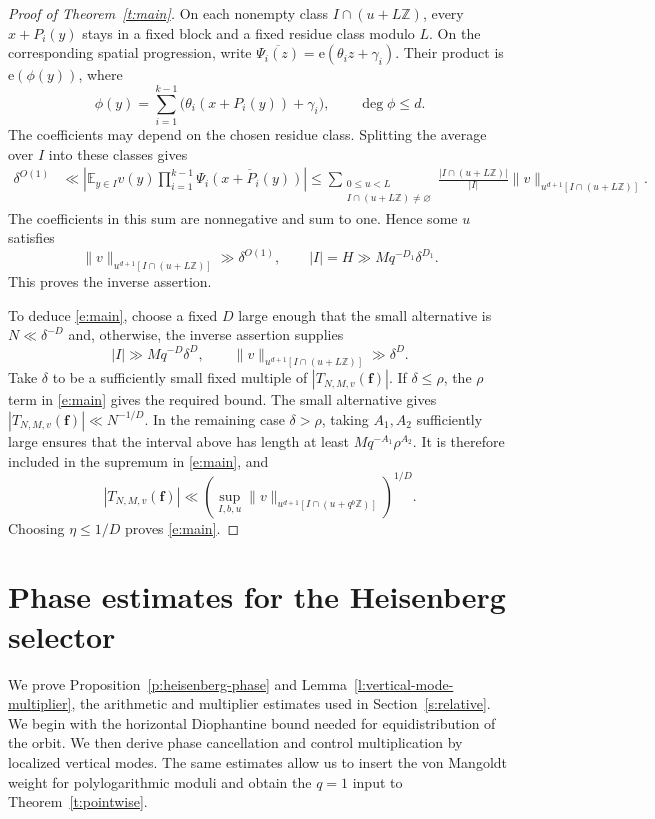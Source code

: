 \documentclass[12pt]{amsart}
\newcommand{\1}{\mathbf 1}
\newcommand{\e}{\mathrm e}
\theoremstyle{definition}
\begin{document}
\begin{proof}[Proof of Theorem~\ref{t:main}]
On each nonempty class $I\cap(u+L\mathbb Z)$, every
$x+P_i(y)$ stays in a fixed block and a fixed residue class
modulo $L$. On the corresponding spatial progression, write
$\overline{\Psi_i(z)}=\e(\theta_i z+\gamma_i)$.
Their product is $\e(\phi(y))$, where
\[
 \phi(y)=\sum_{i=1}^{k-1}
       \bigl(\theta_i(x+P_i(y))+\gamma_i\bigr),
 \qquad \deg\phi\leq d.
\]
The coefficients may depend on the chosen residue class.
Splitting the average over $I$ into these classes gives
\[
\begin{aligned}
 \delta^{O(1)}
 &\ll
 \left|\mathbb E_{y\in I}v(y)
       \prod_{i=1}^{k-1}\overline{\Psi_i(x+P_i(y))}\right|\leq
 \sum_{\substack{0\leq u<L\\I\cap(u+L\mathbb Z)\ne\varnothing}}
 \frac{|I\cap(u+L\mathbb Z)|}{|I|}
 \|v\|_{u^{d+1}[I\cap(u+L\mathbb Z)]}.
\end{aligned}
\]
The coefficients in this sum are nonnegative and sum to one.
Hence some $u$ satisfies
\[
 \|v\|_{u^{d+1}[I\cap(u+L\mathbb Z)]}\gg\delta^{O(1)},
 \qquad |I|=H\gg Mq^{-D_1}\delta^{D_1}.
\]
This proves the inverse assertion.

To deduce \eqref{e:main}, choose a fixed $D$ large enough that
the small alternative is $N\ll\delta^{-D}$ and, otherwise, the
inverse assertion supplies
\[
 |I|\gg Mq^{-D}\delta^D,
 \qquad
 \|v\|_{u^{d+1}[I\cap(u+L\mathbb Z)]}\gg\delta^D.
\]
Take $\delta$ to be a sufficiently small fixed multiple of
$|T_{N,M,v}(\mathbf f)|$. If $\delta\leq\rho$, the $\rho$ term
in \eqref{e:main} gives the required bound. The small alternative
gives $|T_{N,M,v}(\mathbf f)|\ll N^{-1/D}$. In the remaining case
$\delta>\rho$, taking $A_1,A_2$ sufficiently large ensures that
the interval above has length at least $Mq^{-A_1}\rho^{A_2}$.
It is therefore included in the supremum in \eqref{e:main}, and
\[
 |T_{N,M,v}(\mathbf f)|
 \ll
 \left(\sup_{I,b,u}
 \|v\|_{u^{d+1}[I\cap(u+q^b\mathbb Z)]}\right)^{1/D}.
\]
Choosing $\eta\leq1/D$ proves \eqref{e:main}.
\end{proof}

\section{Phase estimates for the Heisenberg selector}\label{s:example}

We prove Proposition~\ref{p:heisenberg-phase} and
Lemma~\ref{l:vertical-mode-multiplier}, the arithmetic and multiplier
estimates used in Section~\ref{s:relative}. We begin with the horizontal
Diophantine bound needed for equidistribution of the orbit.
We then derive phase cancellation and control multiplication by
localized vertical modes. The same estimates allow us to insert
the von Mangoldt weight for polylogarithmic moduli and obtain the
\(q=1\) input to Theorem~\ref{t:pointwise}.
\end{document}
